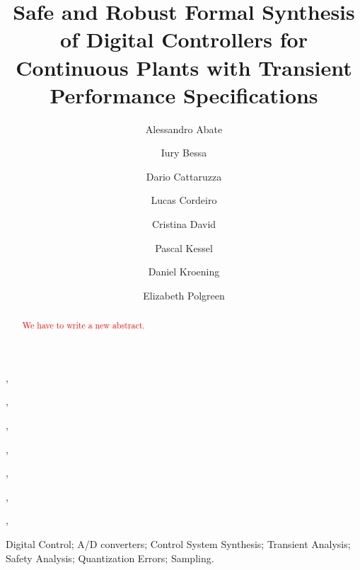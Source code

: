 \documentclass[twocolumn]{autart}    %
\begin{document}
\begin{frontmatter}


\title{Safe and Robust Formal  Synthesis of Digital Controllers for Continuous Plants with Transient Performance Specifications} %


\author[oxford]{Alessandro Abate},
\author[manaus]{Iury Bessa},
\author[oxford]{Dario Cattaruzza},
\author[oxford,manaus]{Lucas Cordeiro},
\author[oxford]{Cristina David},
\author[oxford]{Pascal Kessel},
\author[oxford]{Daniel Kroening},
\author[oxford]{Elizabeth Polgreen}

\address[oxford]{University of Oxford, UK}
\address[manaus]{Federal University of Amazonas, Brazil}



          
\begin{keyword}                           %
Digital Control; A/D converters; Control System Synthesis; Transient Analysis; Safety Analysis; Quantization Errors; Sampling.               %
\end{keyword}                             %



\begin{abstract}                          %
\textcolor{red}{We have to write a new abstract.}
\end{abstract}

\end{frontmatter}
\end{document}
